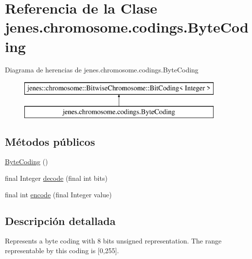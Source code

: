 \hypertarget{classjenes_1_1chromosome_1_1codings_1_1_byte_coding}{\section{Referencia de la Clase jenes.\-chromosome.\-codings.\-Byte\-Coding}
\label{classjenes_1_1chromosome_1_1codings_1_1_byte_coding}
}
Diagrama de herencias de jenes.\-chromosome.\-codings.\-Byte\-Coding\begin{figure}[H]
\begin{center}
\leavevmode
\includegraphics[height=2.000000cm]{classjenes_1_1chromosome_1_1codings_1_1_byte_coding}
\end{center}
\end{figure}
\subsection*{Métodos públicos}
\begin{DoxyCompactItemize}
\item 
\hyperlink{classjenes_1_1chromosome_1_1codings_1_1_byte_coding_ae5e1d99eebeb9d81d5185808e319dc8a}{Byte\-Coding} ()
\item 
final Integer \hyperlink{classjenes_1_1chromosome_1_1codings_1_1_byte_coding_a9cc6cb469c2fd907f50d9604fe6cb0fa}{decode} (final int bits)
\item 
final int \hyperlink{classjenes_1_1chromosome_1_1codings_1_1_byte_coding_a1b6e6c0f7996c3d497b257c7417cc28d}{encode} (final Integer value)
\end{DoxyCompactItemize}


\subsection{Descripción detallada}
Represents a byte coding with 8 bits unsigned representation. The range representable by this coding is \mbox{[}0,255\mbox{]}.

